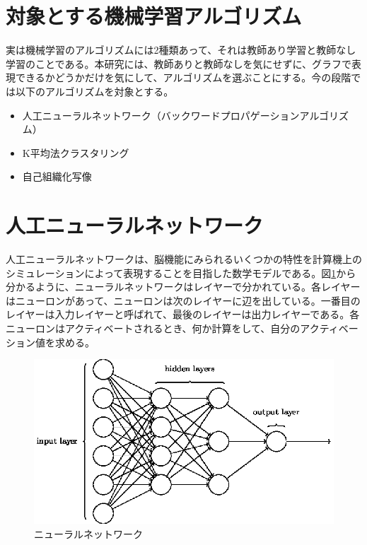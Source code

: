 \documentclass[]{iplresume} %
\begin{document}
\section{対象とする機械学習アルゴリズム}
実は機械学習のアルゴリズムには2種類あって、それは教師あり学習と教師なし学習のことである。本研究には、教師ありと教師なしを気にせずに、グラフで表現できるかどうかだけを気にして、アルゴリズムを選ぶことにする。今の段階では以下のアルゴリズムを対象とする。
\begin{itemize}
\item 人工ニューラルネットワーク（バックワードプロパゲーションアルゴリズム）
\item K平均法クラスタリング
\item 自己組織化写像
\end{itemize}

\section{人工ニューラルネットワーク}
人工ニューラルネットワークは、脳機能にみられるいくつかの特性を計算機上のシミュレーションによって表現することを目指した数学モデルである。図\ref{nn}から分かるように、ニューラルネットワークはレイヤーで分かれている。各レイヤーはニューロンがあって、ニューロンは次のレイヤーに辺を出している。一番目のレイヤーは入力レイヤーと呼ばれて、最後のレイヤーは出力レイヤーである。各ニューロンはアクティベートされるとき、何か計算をして、自分のアクティベーション値を求める。

\begin{figure}
\includegraphics[scale=0.9]{nn.eps}
\caption{ニューラルネットワーク}
\label{nn}
\end{figure}
\end{document}
